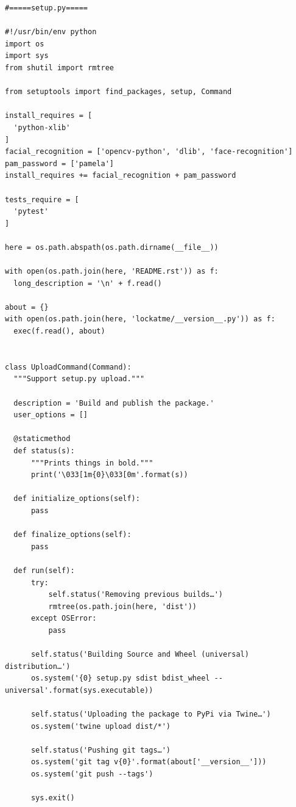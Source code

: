 \documentclass[french]{report}
\begin{document}
\begin{verbatim}
#=====setup.py=====

#!/usr/bin/env python
import os
import sys
from shutil import rmtree

from setuptools import find_packages, setup, Command

install_requires = [
  'python-xlib'
]
facial_recognition = ['opencv-python', 'dlib', 'face-recognition']
pam_password = ['pamela']
install_requires += facial_recognition + pam_password

tests_require = [
  'pytest'
]

here = os.path.abspath(os.path.dirname(__file__))

with open(os.path.join(here, 'README.rst')) as f:
  long_description = '\n' + f.read()

about = {}
with open(os.path.join(here, 'lockatme/__version__.py')) as f:
  exec(f.read(), about)


class UploadCommand(Command):
  """Support setup.py upload."""

  description = 'Build and publish the package.'
  user_options = []

  @staticmethod
  def status(s):
      """Prints things in bold."""
      print('\033[1m{0}\033[0m'.format(s))

  def initialize_options(self):
      pass

  def finalize_options(self):
      pass

  def run(self):
      try:
          self.status('Removing previous builds…')
          rmtree(os.path.join(here, 'dist'))
      except OSError:
          pass

      self.status('Building Source and Wheel (universal) distribution…')
      os.system('{0} setup.py sdist bdist_wheel --universal'.format(sys.executable))

      self.status('Uploading the package to PyPi via Twine…')
      os.system('twine upload dist/*')

      self.status('Pushing git tags…')
      os.system('git tag v{0}'.format(about['__version__']))
      os.system('git push --tags')

      sys.exit()



\end{verbatim}
\end{document}
